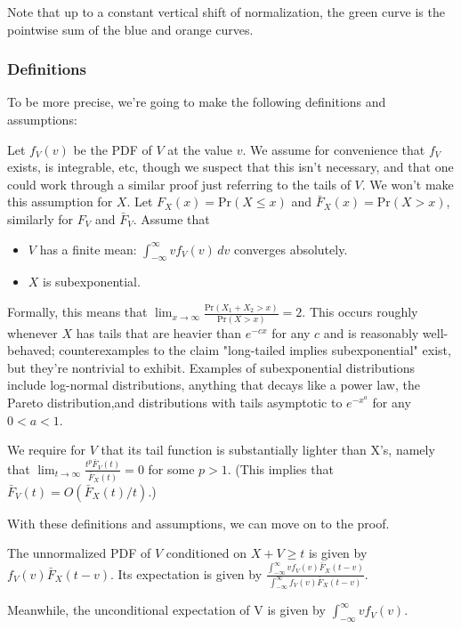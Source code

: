 \documentclass[../main.tex]{subfiles}
\begin{document}
Note that up to a constant vertical shift of normalization, the green curve is the pointwise sum of the blue and orange curves.

\subsubsection{Definitions}

To be more precise, we're going to make the following definitions and assumptions:

Let \(f_V(v)\) be the PDF of \(V\) at the value \(v\). We assume for convenience that \(f_V\) exists, is integrable, etc, though we suspect that this isn't necessary, and that one could work through a similar proof just referring to the tails of \(V\). We won't make this assumption for \(X\).
Let \(F_X(x)=\text{Pr}(X\le x)\) and \(\bar{F}_X(x)=\text{Pr}(X>x)\), similarly for \(F_V\) and \(\bar{F}_V\). 
Assume that
\begin{itemize}
    \item \(V\) has a finite mean: \(\int_{-\infty}^\infty vf_V(v)\,dv\) converges absolutely.
    \item \(X\) is subexponential.
\end{itemize}

Formally, this means that \(\lim_{x\to\infty}\frac{\text{Pr}(X_1+X_2>x)}{\text{Pr}(X>x)} = 2\). 
This occurs roughly whenever \(X\) has tails that are heavier than \(e^{-cx}\) for any \(c\) and is reasonably well-behaved; counterexamples to the claim "long-tailed implies subexponential" exist, but they're nontrivial to exhibit.
Examples of subexponential distributions include log-normal distributions, anything that decays like a power law, the Pareto distribution,and distributions with tails asymptotic to \(e^{-x^a}\) for any \(0<a<1\).

We require for \(V\) that its tail function is substantially lighter than X's, namely that \(\lim_{t\to\infty}\frac{t^p\bar F_V(t)}{\bar F_X(t)} = 0\) for some \(p > 1\). (This implies that \(\bar F_V(t) = O(\bar F_X(t) / t)\).)

With these definitions and assumptions, we can move on to the proof. 

The unnormalized PDF of \(V\) conditioned on \(X+V\ge t\) is given by \(f_V(v)\bar{F}_X(t-v)\). Its expectation is given by \(\frac{\int_{-\infty}^\infty vf_V(v)\bar{F}_X(t-v)} {\int_{-\infty}^\infty f_V(v)\bar{F}_X(t-v)}\).

Meanwhile, the unconditional expectation of V is given by \(\int_{-\infty}^\infty vf_V(v)\).
\end{document}
